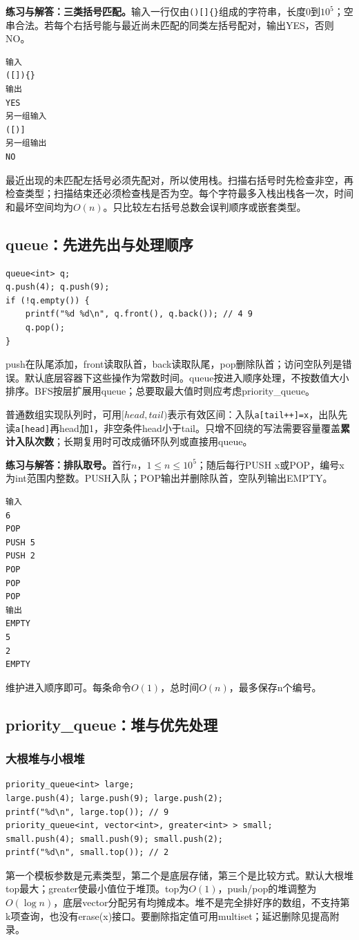 \textbf{练习与解答：三类括号匹配。}输入一行仅由\texttt{()[]\{\}}组成的字符串，长度0到$10^5$；空串合法。若每个右括号能与最近尚未匹配的同类左括号配对，输出YES，否则NO。
\begin{verbatim}
输入
([]){}
输出
YES
另一组输入
([)]
另一组输出
NO
\end{verbatim}

最近出现的未匹配左括号必须先配对，所以使用栈。扫描右括号时先检查非空，再检查类型；扫描结束还必须检查栈是否为空。每个字符最多入栈出栈各一次，时间和最坏空间均为$O(n)$。只比较左右括号总数会误判顺序或嵌套类型。

\subsection{queue：先进先出与处理顺序}
\begin{lstlisting}
queue<int> q;
q.push(4); q.push(9);
if (!q.empty()) {
    printf("%d %d\n", q.front(), q.back()); // 4 9
    q.pop();
}
\end{lstlisting}
push在队尾添加，front读取队首，back读取队尾，pop删除队首；访问空队列是错误。默认底层容器下这些操作为常数时间。queue按进入顺序处理，不按数值大小排序。BFS按层扩展用queue；总要取最大值时则应考虑priority\_queue。

普通数组实现队列时，可用$[head,tail)$表示有效区间：入队\texttt{a[tail++]=x}，出队先读\texttt{a[head]}再head加1，非空条件head小于tail。只增不回绕的写法需要容量覆盖\textbf{累计入队次数}；长期复用时可改成循环队列或直接用queue。

\textbf{练习与解答：排队取号。}首行$n$，$1\le n\le10^5$；随后每行PUSH x或POP，编号x为int范围内整数。PUSH入队；POP输出并删除队首，空队列输出EMPTY。
\begin{verbatim}
输入
6
POP
PUSH 5
PUSH 2
POP
POP
POP
输出
EMPTY
5
2
EMPTY
\end{verbatim}
维护进入顺序即可。每条命令$O(1)$，总时间$O(n)$，最多保存n个编号。

\subsection{priority\_queue：堆与优先处理}
\subsubsection{大根堆与小根堆}
\begin{lstlisting}
priority_queue<int> large;
large.push(4); large.push(9); large.push(2);
printf("%d\n", large.top()); // 9
priority_queue<int, vector<int>, greater<int> > small;
small.push(4); small.push(9); small.push(2);
printf("%d\n", small.top()); // 2
\end{lstlisting}
第一个模板参数是元素类型，第二个是底层存储，第三个是比较方式。默认大根堆top最大；greater使最小值位于堆顶。top为$O(1)$，push/pop的堆调整为$O(\log n)$，底层vector分配另有均摊成本。堆不是完全排好序的数组，不支持第k项查询，也没有erase(x)接口。要删除指定值可用multiset；延迟删除见提高附录。

